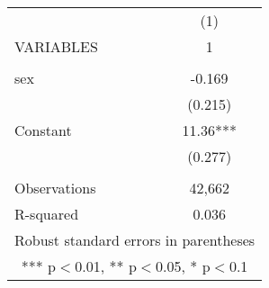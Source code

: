 \documentclass[]{article}
\begin{document}
\begin{tabular}{lc} \hline
 & (1) \\
VARIABLES & 1 \\ \hline
 &  \\
sex & -0.169 \\
 & (0.215) \\
Constant & 11.36*** \\
 & (0.277) \\
 &  \\
Observations & 42,662 \\
 R-squared & 0.036 \\ \hline
\multicolumn{2}{c}{ Robust standard errors in parentheses} \\
\multicolumn{2}{c}{ *** p$<$0.01, ** p$<$0.05, * p$<$0.1} \\
\end{tabular}
\end{document}
